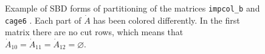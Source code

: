 \begin{figure}[h]
	\centering
	 \hspace{1cm}
	\caption{Example of SBD forms of partitioning of the matrices \texttt{impcol\_b} \cite{matrixmarket} and \texttt{cage6} \cite{ufl}. Each part of $\dot{A}$ has been colored differently. In the first matrix there are no cut rows, which means that $\dot{A}_{10}=\dot{A}_{11} =\dot{A}_{12} = \varnothing$.} \label{fig:sbd-2}
\end{figure}

